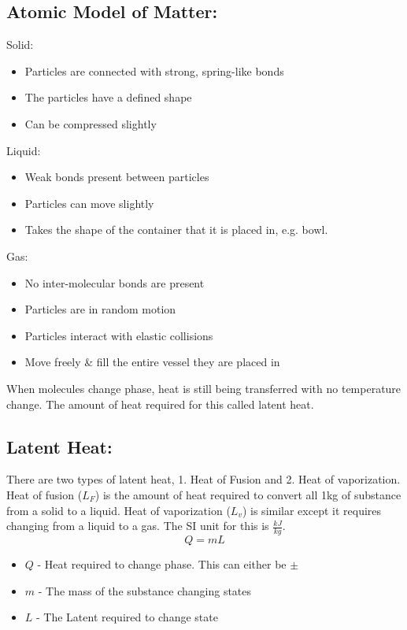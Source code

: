 \documentclass[a5paper]{report}
\begin{document}
	\subsection*{Atomic Model of Matter:}
	Solid:
	\begin{itemize}
		\item Particles are connected with strong, spring-like bonds
		\item The particles have a defined shape
		\item Can be compressed slightly
	\end{itemize}
	Liquid:
	\begin{itemize}
		\item Weak bonds present between particles
		\item Particles can move slightly
		\item Takes the shape of the container that it is placed in, e.g. bowl.
	\end{itemize}
	Gas:
	\begin{itemize}
		\item No inter-molecular bonds are present
		\item Particles are in random motion
		\item Particles interact with elastic collisions
		\item Move freely \& fill the entire vessel they are placed in
	\end{itemize}
	When molecules change phase, heat is still being transferred with no temperature change. The amount of heat required for this called latent heat.

	\subsection*{Latent Heat:}
	There are two types of latent heat, 1. Heat of Fusion and 2. Heat of vaporization. Heat of fusion ($L_{F}$) is the amount of heat required to convert all 1kg of substance from a solid to a liquid. Heat of vaporization ($L_{v}$) is similar except it requires changing from a liquid to a gas. The SI unit for this is $\frac{kJ}{kg}$.
	$$Q=mL$$
	\begin{itemize}
		\item $Q$ - Heat required to change phase. This can either be $\pm$
		\item $m$ - The mass of the substance changing states
		\item $L$ - The Latent required to change state
	\end{itemize}
\end{document}
